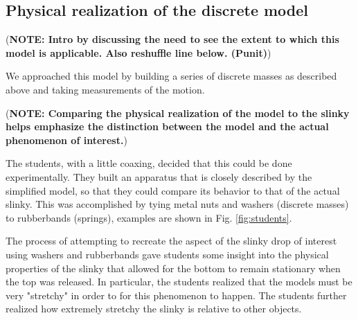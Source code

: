 \documentclass[prb,preprint,superscriptaddress]{revtex4-1}
\newcommand{\NOTE}[1]{\marginpar{\footnotesize\textbf{NOTE}} (\textbf{NOTE: #1})}
\newcommand{\FIGstudents}{
\begin{figure}[t]\center
\texttt{[image: FIGstudents.pdf]}
\caption{\label{fig:students} Students from the 2012 Compass Project summer program with model slinkies built out of washers and rubberbands.}
\end{figure}
}
\begin{document}
\subsection{Physical realization of the discrete model}
\label{subsec:forcesexperiment}

\NOTE{Intro by discussing the need to see the extent to which this model
is applicable. Also reshuffle line below. (Punit)}

We approached this model
by building a series of discrete masses as described above and taking measurements of
the motion.

\NOTE{Comparing the physical realization of the model to the slinky 
helps emphasize the distinction between the model and the actual phenomenon of interest.}


The students, with a little coaxing, decided that this could be done experimentally.  They built an 
apparatus that is closely described by the simplified model, so that they could compare its behavior to that of the 
actual slinky.  This was accomplished by tying metal nuts and washers (discrete masses) to 
rubberbands (springs), examples are shown in Fig. \ref{fig:students}.  


The process of attempting to recreate the aspect of the slinky drop of interest using washers and rubberbands  
gave students some insight into the physical properties of the slinky that allowed for the bottom to  remain 
stationary when the top was released.  In particular, the students realized that the models must be very "stretchy"
in order to for this phenomenon to happen.  The students further realized how extremely stretchy the slinky is 
relative to other objects.
\end{document}
